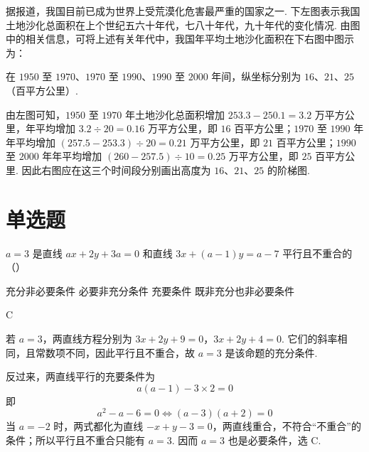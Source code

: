 \begin{problem}
据报道，我国目前已成为世界上受荒漠化危害最严重的国家之一. 下左图表示我国土地沙化总面积在上个世纪五六十年代，七八十年代，九十年代的变化情况. 由图中的相关信息，可将上述有关年代中，我国年平均土地沙化面积在下右图中图示为：\fillinblank{}

\end{problem}

\begin{answer}
在 \(1950\) 至 \(1970\)、\(1970\) 至 \(1990\)、\(1990\) 至 \(2000\) 年间，纵坐标分别为 \(16\)、\(21\)、\(25\)（百平方公里）.
\end{answer}

\begin{solution}
由左图可知，\(1950\) 至 \(1970\) 年土地沙化总面积增加 \(253.3-250.1=3.2\) 万平方公里，年平均增加 \(3.2\div20=0.16\) 万平方公里，即 \(16\) 百平方公里；\(1970\) 至 \(1990\) 年年平均增加 \((257.5-253.3)\div20=0.21\) 万平方公里，即 \(21\) 百平方公里；\(1990\) 至 \(2000\) 年年平均增加 \((260-257.5)\div10=0.25\) 万平方公里，即 \(25\) 百平方公里. 因此右图应在这三个时间段分别画出高度为 \(16\)、\(21\)、\(25\) 的阶梯图.
\end{solution}

\section{单选题}
\begin{problem}
\(a=3\) 是直线 \(ax+2y+3a=0\) 和直线 \(3x+(a-1)y=a-7\) 平行且不重合的（\quad）

\choices
    {充分非必要条件}
    {必要非充分条件}
    {充要条件}
    {既非充分也非必要条件}
\end{problem}

\begin{answer}
C
\end{answer}

\begin{solution}
若 \(a=3\)，两直线方程分别为
\(3x+2y+9=0\)，\(3x+2y+4=0\).
它们的斜率相同，且常数项不同，因此平行且不重合，故 \(a=3\) 是该命题的充分条件.

反过来，两直线平行的充要条件为
\[
a(a-1)-3\times2=0
\]
即
\[
a^2-a-6=0\Longleftrightarrow (a-3)(a+2)=0
\]
当 \(a=-2\) 时，两式都化为直线 \(-x+y-3=0\)，两直线重合，不符合“不重合”的条件；所以平行且不重合只能有 \(a=3\). 因而 \(a=3\) 也是必要条件，选 C.
\end{solution}

